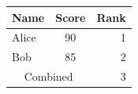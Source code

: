 \begin{tabular}{lcr}
\hline
Name & Score & Rank \\
\hline
Alice & 90 & 1 \\
Bob & 85 & 2 \\
\multicolumn{2}{c}{Combined} & 3 \\
\hline
\end{tabular}
